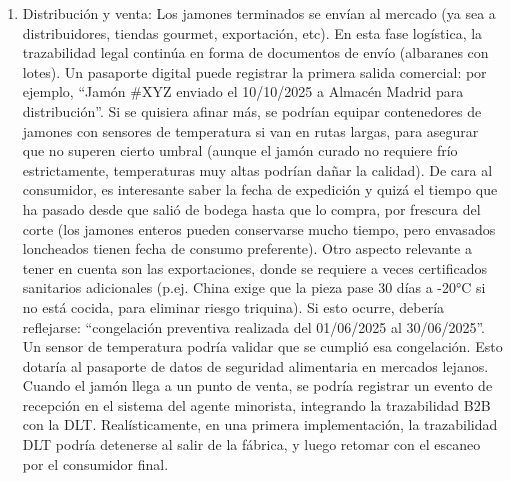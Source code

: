 \begin{enumerate}
    \item Distribución y venta: Los jamones terminados se envían al mercado (ya sea a distribuidores, tiendas gourmet, exportación, etc). En esta fase logística, la trazabilidad legal continúa en forma de documentos de envío (albaranes con lotes). Un pasaporte digital puede registrar la primera salida comercial: por ejemplo, “Jamón \#XYZ enviado el 10/10/2025 a Almacén Madrid para distribución”. Si se quisiera afinar más, se podrían equipar contenedores de jamones con sensores de temperatura si van en rutas largas, para asegurar que no superen cierto umbral (aunque el jamón curado no requiere frío estrictamente, temperaturas muy altas podrían dañar la calidad). De cara al consumidor, es interesante saber la fecha de expedición y quizá el tiempo que ha pasado desde que salió de bodega hasta que lo compra, por frescura del corte (los jamones enteros pueden conservarse mucho tiempo, pero envasados loncheados tienen fecha de consumo preferente). Otro aspecto relevante a tener en cuenta son las exportaciones, donde se requiere a veces certificados sanitarios adicionales (p.ej. China exige que la pieza pase 30 días a -20°C si no está cocida, para eliminar riesgo triquina). Si esto ocurre, debería reflejarse: “congelación preventiva realizada del 01/06/2025 al 30/06/2025”. Un sensor de temperatura podría validar que se cumplió esa congelación. Esto dotaría al pasaporte de datos de seguridad alimentaria en mercados lejanos. Cuando el jamón llega a un punto de venta, se podría registrar un evento de recepción en el sistema del agente minorista, integrando la trazabilidad B2B con la DLT. Realísticamente, en una primera implementación, la trazabilidad DLT podría detenerse al salir de la fábrica, y luego retomar con el escaneo por el consumidor final.

\end{enumerate}
